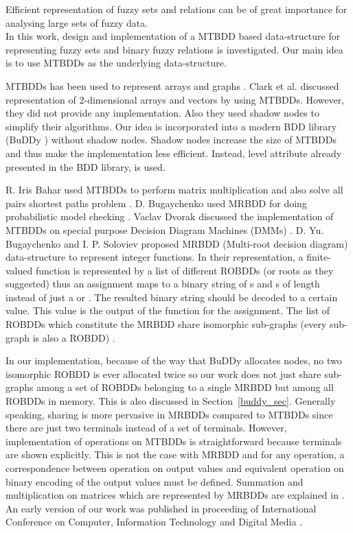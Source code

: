 \documentclass[4pt]{article}
\begin{document}
Efficient representation of fuzzy sets and relations can be of great importance for analysing large sets of fuzzy data.\\In this work, design and implementation of a MTBDD based data-structure for representing fuzzy sets and binary fuzzy relations is investigated. Our main idea is to use MTBDDs \cite{mtbdd} as the underlying data-structure.

MTBDDs has been used to represent arrays and graphs \cite{mtbdd,add}. Clark et al. discussed representation of 2-dimensional arrays and vectors by using MTBDDs. However, they did not provide any implementation. Also they used shadow nodes to simplify their algorithms. Our idea is incorporated into a modern BDD library (BuDDy \cite{buddy}) without shadow nodes. Shadow nodes increase the size of MTBDDs and thus make the implementation less efficient. Instead, level attribute already presented in the BDD library, is used.

R. Iris Bahar used MTBDDs to perform matrix multiplication and also solve all pairs shortest paths problem \cite{add}. D. Bugaychenko used MRBDD for doing probabilistic model checking \cite{model_checking_mrbdd}. Vaclav Dvorak discussed the implementation of MTBDDs on special purpose Decision Diagram Machines (DMMs) \cite{branching_programs}. D. Yu. Bugaychenko and I. P. Soloviev proposed MRBDD (Multi-root decision diagram) data-structure to represent integer functions. In their representation, a finite-valued function is represented by a list of  different ROBDDs (or  roots as they suggested) thus an assignment maps to a binary string of s and s of length  instead of just a  or . The resulted binary string should be decoded to a certain value. This value is the output of the function for the assignment. The list of ROBDDs which constitute the MRBDD share isomorphic sub-graphs (every sub-graph is also a ROBDD) \cite{mrbdd}.

In our implementation, because of the way that BuDDy allocates nodes, no two isomorphic ROBDD is ever allocated twice so our work does not just share sub-graphs among a set of ROBDDs belonging to a single MRBDD but among all ROBDDs in memory. This is also discussed in Section~\ref{buddy_sec}. Generally speaking, sharing is more pervasive in MRBDDs compared to MTBDDs since there are just two terminals instead of a set of terminals. However, implementation of operations on MTBDDs is straightforward because terminals are shown explicitly. This is not the case with MRBDD and for any operation, a correspondence between operation on output values and equivalent operation on binary encoding of the output values must be defined. Summation and multiplication on matrices which  are represented by MRBDDs are explained in \cite{mrbdd}.\\
An early version of our work was published in proceeding of International Conference on Computer, Information Technology and Digital Media \cite{citadim}.
\end{document}

